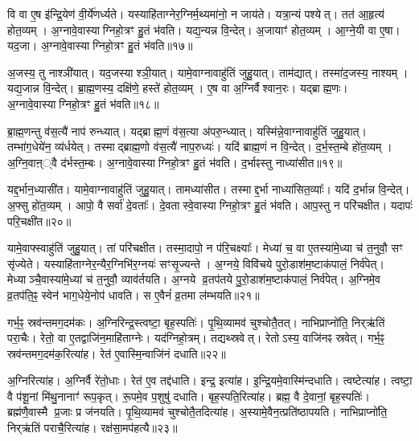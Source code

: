 वि वा ए॒ष इ॑न्द्रि॒येण॑ वी॒र्ये॑णर्ध्यते।
यस्याहि॑ताग्नेर॒ग्निर्म॒थ्यमा॑नो॒ न जाय॑ते।
यत्रा॒न्यं पश्येत्।
तत॑ आ॒हृत्य॑ होत॒व्यम्।
अ॒ग्नावे॒वास्याग्निहो॒त्रꣳ हु॒तं भ॑वति।
यद्य॒न्यन्न वि॒न्देत्।
अ॒जायाꣳ॑ होत॒व्यम्।
आ॒ग्ने॒यी वा ए॒षा।
यद॒जा।
अ॒ग्नावे॒वास्याग्निहो॒त्रꣳ हु॒तं भ॑वति॥१७॥

अ॒जस्य॒ तु नाश्ञी॑यात्।
यद॒जस्याश्ञी॒यात्।
यामे॒वाग्नावाहु॑तिं जुहु॒यात्।
ताम॑द्यात्।
तस्मा॑द॒जस्य॒ नाश्यम्।
यद्य॒जान्न वि॒न्देत्।
ब्रा॒ह्म॒णस्य॒ दक्षि॑णे॒ हस्ते॑ होत॒व्यम्।
ए॒ष वा अ॒ग्निर्वैश्वान॒रः।
यद्ब्राह्म॒णः।
अ॒ग्नावे॒वास्याग्निहो॒त्रꣳ हु॒तं भ॑वति॥१८॥

ब्रा॒ह्म॒णन्तु व॑स॒त्यै॑ नाप॑ रुन्ध्यात्।
यद्ब्राह्म॒णं व॑स॒त्या अ॑परु॒न्ध्यात्।
यस्मि॑न्ने॒वाग्नावाहु॑तिं जुहु॒यात्।
तम्भा॑ग॒धेये॑न॒ व्य॑र्धयेत्।
तस्माद्ब्राह्म॒णो व॑स॒त्यै॑ नाप॒रुध्यः॑।
यदि॑ ब्राह्म॒णं न वि॒न्देत्।
द॒र्भ॒स्त॒म्बे हो॑त॒व्यम्।
अ॒ग्नि॒वाऩ््वै द॑र्भस्त॒म्बः।
अ॒ग्नावे॒वास्याग्निहो॒त्रꣳ हु॒तं भ॑वति।
द॒र्भाꣴस्तु नाध्या॑सीत॥१९॥

यद्द॒र्भान॒ध्यासी॑त।
यामे॒वाग्नावाहु॑तिं जुहु॒यात्।
तामध्या॑सीत।
तस्माद्द॒र्भा नाध्या॑सित॒व्याः᳚।
यदि॑ द॒र्भान्न वि॒न्देत्।
अ॒फ्सु हो॑त॒व्यम्।
आपो॒ वै सर्वा॑ दे॒वताः᳚।
दे॒वतास्वे॒वास्याग्निहो॒त्रꣳ हु॒तं भ॑वति।
आप॒स्तु न परि॑चक्षीत।
यदापः॑ परि॒चक्षी॑त॥२०॥

यामे॒वाफ्स्वाहु॑तिं जुहु॒यात्।
तां परि॑चक्षीत।
तस्मा॒दापो॒ न प॑रि॒चक्ष्याः᳚।
मेध्या॑ च॒ वा ए॒तस्या॑मे॒ध्या च॑ त॒नुवौ॒ सꣳ सृ॑ज्येते।
यस्याहि॑ताग्नेर॒न्यैर॒ग्निभि॑र॒ग्नयः॑ सꣳसृ॒ज्यन्ते।
अ॒ग्नये॒ विवि॑चये पुरो॒डाश॑म॒ष्टाक॑पालं॒ निर्व॑पेत्।
मेध्याञ्चै॒वास्या॑मे॒ध्यां च॑ त॒नुवौ॒ व्याव॑र्तयति।
अ॒ग्नये व्र॒तप॑तये पु॒रो॒डाश॑म॒ष्टाक॑पालं॒ निर्व॑पेत्।
अ॒ग्निमे॒व व्र॒तप॑ति॒ꣴ॒ स्वेन॑ भाग॒धेये॒नोप॑ धावति।
स ए॒वैनं॑ व्र॒तमा ल॑म्भयति॥२१॥

गर्भ॒ꣴ॒ स्रव॑न्तमग॒दम॑कः।
अ॒ग्निरिन्द्र॒स्त्वष्टा॒ बृह॒स्पतिः॑।
पृ॒थि॒व्यामव॑ चुश्चोतै॒तत्।
नाभिप्राप्नो॑ति॒ निर्‌\mbox{}ऋ॑तिं परा॒चैः।
रेतो॒ वा ए॒तद्वाजि॑न॒माहि॑ताग्नेः।
यद॑ग्निहो॒त्रम्।
तद्यथ्स्रवेत्।
रेतो\-ऽस्य॒ वाजि॑नꣴ स्रवेत्।
गर्भ॒ꣴ॒ स्रव॑न्तमग॒दम॑क॒रित्या॑ह।
रेत॑ ए॒वास्मि॒न्वाजि॑नं दधाति॥२२॥

अ॒ग्निरित्या॑ह।
अ॒ग्निर्वै रे॑तो॒धाः।
रेत॑ ए॒व तद्द॑धाति।
इन्द्र॒ इत्या॑ह।
इ॒न्द्रि॒यमे॒वास्मि॑न्दधाति।
त्वष्टेत्या॑ह।
त्वष्टा॒ वै प॑शू॒नां मि॑थु॒नानाꣳ॑ रूप॒कृत्।
रू॒पमे॒व प॒शुषु॑ दधाति।
बृह॒स्पति॒रित्या॑ह।
ब्रह्म॒ वै दे॒वानां॒ बृह॒स्पतिः॑।
ब्रह्म॑णै॒वास्मै प्र॒जाः प्र ज॑नयति।
पृ॒थि॒व्यामव॑ चुश्चोतै॒तदित्या॑ह।
अ॒स्यामे॒वैन॒त्प्रति॑ष्ठापयति।
नाभिप्राप्नो॑ति॒ निर्‌\mbox{}ऋ॑तिं पराचै॒रित्या॑ह।
रक्ष॑सा॒मप॑हत्यै॥२३॥

